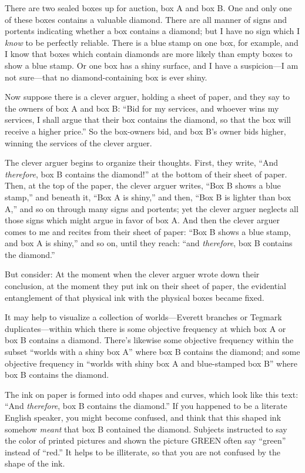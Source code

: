 {
 There are two sealed boxes up for auction, box A and box B. One
and only one of these boxes contains a valuable diamond. There are all
manner of signs and portents indicating whether a box contains a
diamond; but I have no sign which I \textit{know} to be perfectly
reliable. There is a blue stamp on one box, for example, and I know
that boxes which contain diamonds are more likely than empty boxes to
show a blue stamp. Or one box has a shiny surface, and I have a
suspicion---I am not sure---that no diamond-containing box is ever
shiny. }

{
 Now suppose there is a clever arguer, holding a sheet of paper,
and they say to the owners of box A and box B: ``Bid
for my services, and whoever wins my services, I shall argue that their
box contains the diamond, so that the box will receive a higher
price.'' So the box-owners bid, and box
B's owner bids higher, winning the services of the
clever arguer.}

{
 The clever arguer begins to organize their thoughts. First, they
write, ``And \textit{therefore}, box B contains the
diamond!'' at the bottom of their sheet of paper.
Then, at the top of the paper, the clever arguer writes,
``Box B shows a blue stamp,'' and
beneath it, ``Box A is shiny,'' and
then, ``Box B is lighter than box
A,'' and so on through many signs and portents; yet
the clever arguer neglects all those signs which might argue in favor
of box A. And then the clever arguer comes to me and recites from their
sheet of paper: ``Box B shows a blue stamp, and box A
is shiny,'' and so on, until they reach:
``and \textit{therefore}, box B contains the
diamond.''}

{
 But consider: At the moment when the clever arguer wrote down
their conclusion, at the moment they put ink on their sheet of paper,
the evidential entanglement of that physical ink with the physical
boxes became fixed.}

{
 It may help to visualize a collection of worlds---Everett branches
or Tegmark duplicates{}---within which there is some objective
frequency at which box A or box B contains a diamond.
There's likewise some objective frequency within the
subset ``worlds with a shiny box A''
where box B contains the diamond; and some objective frequency in
``worlds with shiny box A and blue-stamped box
B'' where box B contains the diamond.}

{
 The ink on paper is formed into odd shapes and curves, which look
like this text: ``And \textit{therefore}, box B
contains the diamond.'' If you happened to be a
literate English speaker, you might become confused, and think that
this shaped ink somehow \textit{meant} that box B contained the
diamond. Subjects instructed to say the color of printed pictures and
shown the picture GREEN often say
``green'' instead of
``red.'' It helps to be illiterate,
so that you are not confused by the shape of the ink.}

